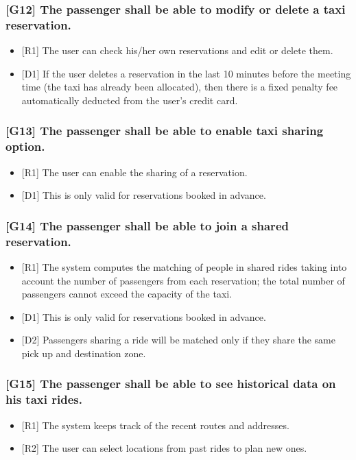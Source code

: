 \documentclass[a4paper,11pt]{report} %
\begin{document}
	\subsubsection{{[}G12{]} The passenger shall be able to modify or delete a taxi reservation.}
	\begin{itemize}
		\item {[}R1{]} The user can check his/her own reservations and edit or delete them.
		\item {[}D1{]} If the user deletes a reservation in the last 10 minutes before the meeting time (the taxi has already been allocated), then there is a fixed penalty fee automatically deducted from the user's credit card.
	\end{itemize}
	
	\subsubsection{{[}G13{]} The passenger shall be able to enable taxi sharing option.}
	\begin{itemize}
		\item {[}R1{]} The user can enable the sharing of a reservation.
		\item {[}D1{]} This is only valid for reservations booked in advance.
	\end{itemize}
	
	\subsubsection{{[}G14{]} The passenger shall be able to join a shared reservation.}
	\begin{itemize}
		\item {[}R1{]} The system computes the matching of people in shared rides taking into account the number of passengers from each reservation; the total number of passengers cannot exceed the capacity of the taxi.
		\item {[}D1{]} This is only valid for reservations booked in advance.
		\item {[}D2{]} Passengers sharing a ride will be matched only if they share the same pick up and destination zone.
	\end{itemize}
	
	\subsubsection{{[}G15{]} The passenger shall be able to see historical data on his taxi rides.}
	\begin{itemize}
		\item {[}R1{]} The system keeps track of the recent routes and addresses.
		\item {[}R2{]} The user can select locations from past rides to plan new ones.
	\end{itemize}
\end{document}
